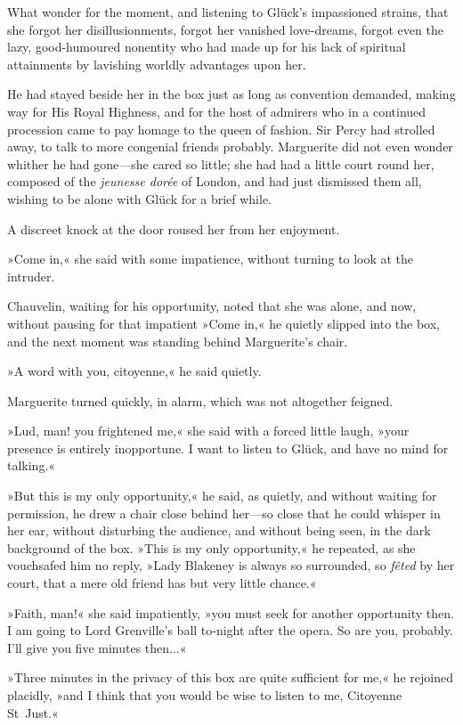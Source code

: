 What wonder for the moment, and listening to Glück's impassioned strains, that she forgot her disillusionments, forgot her vanished love-dreams, forgot even the lazy, good-humoured nonentity who had made up for his lack of spiritual attainments by lavishing worldly advantages upon her.

He had stayed beside her in the box just as long as convention demanded, making way for His Royal Highness, and for the host of admirers who in a continued procession came to pay homage to the queen of fashion. Sir Percy had strolled away, to talk to more congenial friends probably. Marguerite did not even wonder whither he had gone\allowbreak---\allowbreak she cared so little; she had had a little court round her, composed of the \textit{jeunesse dorée} of London, and had just dismissed them all, wishing to be alone with Glück for a brief while.

A discreet knock at the door roused her from her enjoyment.

»Come in,« she said with some impatience, without turning to look at the intruder.

Chauvelin, waiting for his opportunity, noted that she was alone, and now, without pausing for that impatient »Come in,« he quietly slipped into the box, and the next moment was standing behind Marguerite's chair.

»A word with you, citoyenne,« he said quietly.

Marguerite turned quickly, in alarm, which was not altogether feigned.

»Lud, man! you frightened me,« she said with a forced little laugh, »your presence is entirely inopportune. I want to listen to Glück, and have no mind for talking.«

»But this is my only opportunity,« he said, as quietly, and without waiting for permission, he drew a chair close behind her\allowbreak---\allowbreak so close that he could whisper in her ear, without disturbing the audience, and without being seen, in the dark background of the box. »This is my only opportunity,« he repeated, as she vouchsafed him no reply, »Lady Blakeney is always so surrounded, so \textit{fêted} by her court, that a mere old friend has but very little chance.«

»Faith, man!« she said impatiently, »you must seek for another opportunity then. I am going to Lord Grenville's ball to-night after the opera. So are you, probably. I'll give you five minutes then...«

»Three minutes in the privacy of this box are quite sufficient for me,« he rejoined placidly, »and I think that you would be wise to listen to me, Citoyenne St~Just.«


